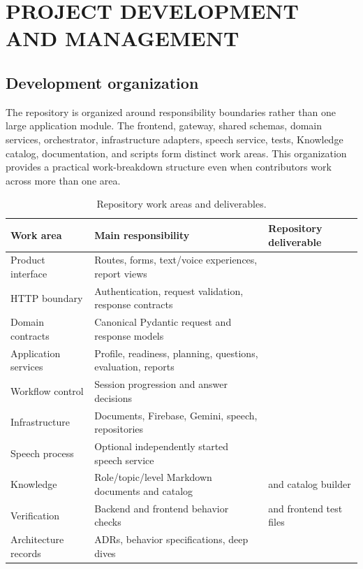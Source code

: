 \chapter{PROJECT DEVELOPMENT AND MANAGEMENT}\label{ch:management}

\section{Development organization}

The repository is organized around responsibility boundaries rather than one large application module. The frontend, gateway, shared schemas, domain services, orchestrator, infrastructure adapters, speech service, tests, Knowledge catalog, documentation, and scripts form distinct work areas. This organization provides a practical work-breakdown structure even when contributors work across more than one area.

\begin{table}[htbp]\centering
\caption{Repository work areas and deliverables.}\label{tab:work-areas}
\begin{tabularx}{\textwidth}{p{}YY}\toprule
Work area & Main responsibility & Repository deliverable\\ \midrule
Product interface & Routes, forms, text/voice experiences, report views & \\
HTTP boundary & Authentication, request validation, response contracts & \\
Domain contracts & Canonical Pydantic request and response models & \\
Application services & Profile, readiness, planning, questions, evaluation, reports & \\
Workflow control & Session progression and answer decisions & \\
Infrastructure & Documents, Firebase, Gemini, speech, repositories & \\
Speech process & Optional independently started speech service & \\
Knowledge & Role/topic/level Markdown documents and catalog &  and catalog builder\\
Verification & Backend and frontend behavior checks &  and frontend test files\\
Architecture records & ADRs, behavior specifications, deep dives & \\
\bottomrule\end{tabularx}
\end{table}

